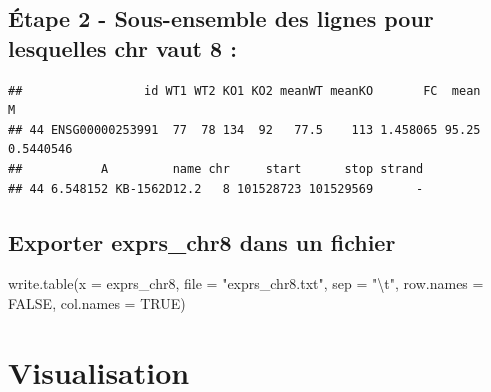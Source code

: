 \documentclass[
]{book}
\newenvironment{Shaded}{\begin{snugshade}}{\end{snugshade}}
\newcommand{\AttributeTok}[1]{\textcolor[rgb]{0.77,0.63,0.00}{#1}}
\newcommand{\ConstantTok}[1]{\textcolor[rgb]{0.00,0.00,0.00}{#1}}
\newcommand{\DecValTok}[1]{\textcolor[rgb]{0.00,0.00,0.81}{#1}}
\newcommand{\FunctionTok}[1]{\textcolor[rgb]{0.00,0.00,0.00}{#1}}
\newcommand{\NormalTok}[1]{#1}
\newcommand{\OtherTok}[1]{\textcolor[rgb]{0.56,0.35,0.01}{#1}}
\newcommand{\SpecialCharTok}[1]{\textcolor[rgb]{0.00,0.00,0.00}{#1}}
\newcommand{\StringTok}[1]{\textcolor[rgb]{0.31,0.60,0.02}{#1}}
\begin{document}
\hypertarget{uxe9tape-2---sous-ensemble-des-lignes-pour-lesquelles-chr-vaut-8}{%
\subsection{Étape 2 - Sous-ensemble des lignes pour lesquelles chr vaut 8 :}\label{uxe9tape-2---sous-ensemble-des-lignes-pour-lesquelles-chr-vaut-8}}

\begin{Shaded}
\end{Shaded}

\begin{verbatim}
##                 id WT1 WT2 KO1 KO2 meanWT meanKO       FC  mean         M
## 44 ENSG00000253991  77  78 134  92   77.5    113 1.458065 95.25 0.5440546
##           A         name chr     start      stop strand
## 44 6.548152 KB-1562D12.2   8 101528723 101529569      -
\end{verbatim}

\hypertarget{exporter-exprs_chr8-dans-un-fichier}{%
\subsection{Exporter exprs\_chr8 dans un fichier}\label{exporter-exprs_chr8-dans-un-fichier}}

\begin{Shaded}
\begin{Highlighting}[]
\FunctionTok{write.table}\NormalTok{(}\AttributeTok{x =}\NormalTok{ exprs\_chr8, }\AttributeTok{file =} \StringTok{"exprs\_chr8.txt"}\NormalTok{, }
   \AttributeTok{sep =} \StringTok{"}\SpecialCharTok{\textbackslash{}t}\StringTok{"}\NormalTok{, }
   \AttributeTok{row.names =} \ConstantTok{FALSE}\NormalTok{, }
   \AttributeTok{col.names =} \ConstantTok{TRUE}\NormalTok{)}
\end{Highlighting}
\end{Shaded}

\hypertarget{visualisation-1}{%
\section{Visualisation}\label{visualisation-1}}
\end{document}
